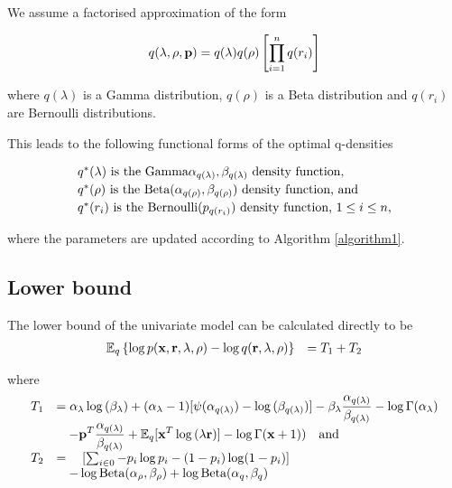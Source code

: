 \documentclass{article}[12pt]
\begin{document}
\noindent We assume a factorised approximation of the form

$$
q(\lambda, \rho, {\bf p}) = q(\lambda) q(\rho) \left [ \prod_{i=1}^n q(r_i) \right ]
$$

\noindent where $q(\lambda)$ is a Gamma distribution, $q(\rho)$ is a Beta distribution and
$q(r_i)$ are Bernoulli distributions.

\noindent This leads to the following functional forms of the optimal q-densities

$$
\begin{array}{l}
\mbox{$q^*(\lambda)$ is the $\text{Gamma} \alpha_{q(\lambda)}, \beta_{q(\lambda)}$ density function,} \\ [0.5ex]
\mbox{$q^*(\rho)$ is the $\text{Beta}(\alpha_{q(\rho)}, \beta_{q(\rho)})$ density function, and} \\ [0.5ex]
\mbox{$q^*(r_i)$  is the $\text{Bernoulli}(p_{q(r_i)})$ density function, $1 \leq i \leq n$,}
\end{array}
$$


\noindent where the parameters are updated according to Algorithm \ref{algorithm1}. 

\subsection{Lower bound}
The lower bound of the univariate model can be calculated directly to be
$$
\begin{array}{rl}
{\mathbb E}_q \left\{ \log{p({\bf x}, {\bf r}, \lambda, \rho)} - \log{q({\bf r}, \lambda, \rho)} \right\} &= T_1 + T_2 \\
\end{array}
$$

\noindent where
$$
\begin{array}{rl}
T_1 & \displaystyle =
\alpha_\lambda \log{(\beta_\lambda)} + (\alpha_\lambda - 1) [\psi(\alpha_{q(\lambda)}) - \log{(\beta_{q(\lambda)})}] - \beta_\lambda \frac{\alpha_{q(\lambda)}}{\beta_{q(\lambda)}} - \log\Gamma(\alpha_\lambda) \\
& \displaystyle \quad -{\bf p}^T\frac{\alpha_{q(\lambda)}}{\beta_{q(\lambda)}} + {\mathbb E}_q[{\bf x}^T \log{(\lambda {\bf r})}] - \log\Gamma({\bf x}+1)) \quad \mbox{and} 
\\ [1ex]
T_2 &= \quad [ \sum_{i \in 0} - p_i \log p_i - (1 - p_i) \log (1 - p_i) ] \\
& \quad - \log \text{Beta} (\alpha_\rho, \beta_\rho) + \log \text{Beta} (\alpha_q, \beta_q)
\end{array}
$$
\end{document}
